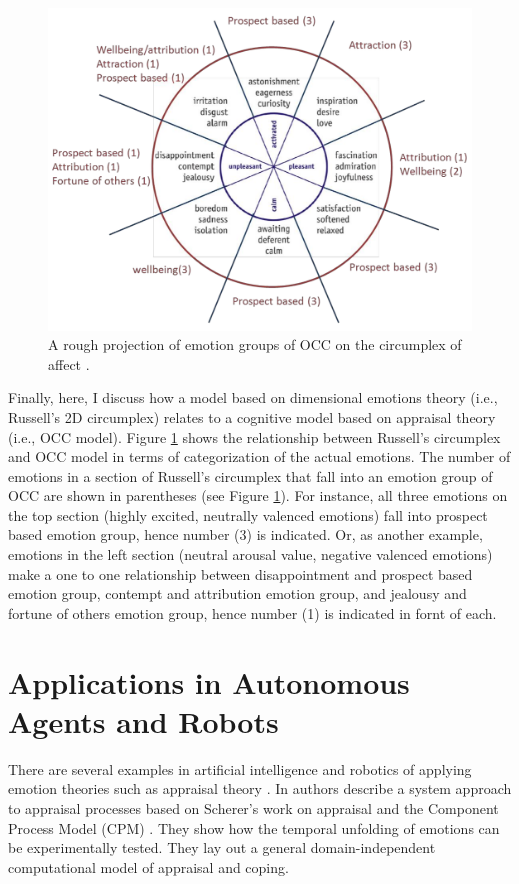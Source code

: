 \documentclass[11pt]{article}
\begin{document}
\begin{figure}[tbh]
  \center
  \includegraphics[width=.9\textwidth]{figure/occ-circumplex-mapping.png}
  \caption{A rough projection of emotion groups of OCC on the circumplex of
  affect \cite{ahmadpour:occ-dimensional-comparison}.}
  \label{fig:occ-circumplex}
\end{figure}

Finally, here, I discuss how a model based on dimensional emotions theory
(i.e., Russell's 2D circumplex) relates to a cognitive model based on appraisal
theory (i.e., OCC model). Figure \ref{fig:occ-circumplex} shows the relationship
between Russell's circumplex and OCC model in terms of categorization of the
actual emotions. The number of emotions in a section of Russell's circumplex
that fall into an emotion group of OCC are shown in parentheses (see Figure
\ref{fig:occ-circumplex}). For instance, all three emotions on the top section
(highly excited, neutrally valenced emotions) fall into prospect based emotion
group, hence number (3) is indicated. Or, as another example, emotions in the
left section (neutral arousal value, negative valenced emotions) make a one to
one relationship between disappointment and prospect based emotion group,
contempt and attribution emotion group, and jealousy and fortune of others
emotion group, hence number (1) is indicated in fornt of each.

\section{Applications in Autonomous Agents and Robots}
\label{sec:applications}

There are several examples in artificial intelligence and robotics of applying
emotion theories such as appraisal theory
\cite{adam:bdi-emotional-companion,kim:model-hri-appraisal,
marsella:ema-process-model}. In \cite{sander:systems-approach-appraisal} authors
describe a system approach to appraisal processes based on Scherer's work on
appraisal and the Component Process Model (CPM)
\cite{scherer:nature-function-emotion}. They show how the temporal unfolding of
emotions can be experimentally tested. They lay out a general domain-independent
computational model of appraisal and coping.
\end{document}
